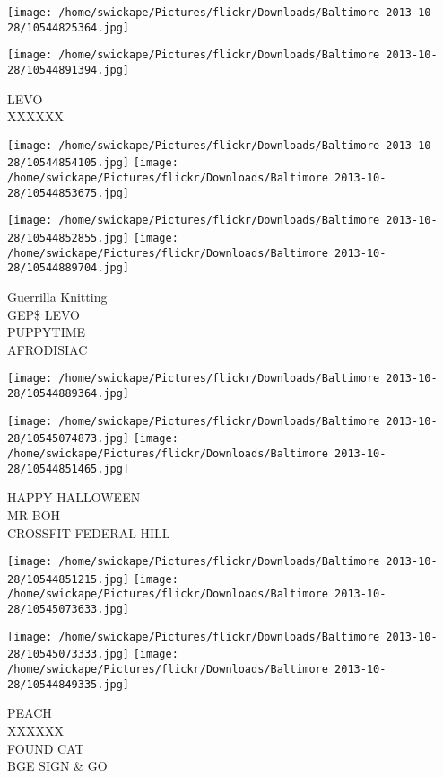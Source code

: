 \documentclass[10pt,letterpaper]{article}
\begin{document}
\texttt{[image: /home/swickape/Pictures/flickr/Downloads/Baltimore 2013-10-28/10544825364.jpg]}

\vspace{0.25in}
\texttt{[image: /home/swickape/Pictures/flickr/Downloads/Baltimore 2013-10-28/10544891394.jpg]}

LEVO\\
XXXXXX\\
\pagebreak

\texttt{[image: /home/swickape/Pictures/flickr/Downloads/Baltimore 2013-10-28/10544854105.jpg]}
\texttt{[image: /home/swickape/Pictures/flickr/Downloads/Baltimore 2013-10-28/10544853675.jpg]}

\texttt{[image: /home/swickape/Pictures/flickr/Downloads/Baltimore 2013-10-28/10544852855.jpg]}
\texttt{[image: /home/swickape/Pictures/flickr/Downloads/Baltimore 2013-10-28/10544889704.jpg]}

Guerrilla Knitting\\
GEP\$ LEVO\\
PUPPYTIME\\
AFRODISIAC\\
\pagebreak

\texttt{[image: /home/swickape/Pictures/flickr/Downloads/Baltimore 2013-10-28/10544889364.jpg]}

\vspace{0.25in}
\texttt{[image: /home/swickape/Pictures/flickr/Downloads/Baltimore 2013-10-28/10545074873.jpg]}
\texttt{[image: /home/swickape/Pictures/flickr/Downloads/Baltimore 2013-10-28/10544851465.jpg]}

HAPPY HALLOWEEN\\
MR BOH\\
CROSSFIT FEDERAL HILL\\
\pagebreak

\texttt{[image: /home/swickape/Pictures/flickr/Downloads/Baltimore 2013-10-28/10544851215.jpg]}
\texttt{[image: /home/swickape/Pictures/flickr/Downloads/Baltimore 2013-10-28/10545073633.jpg]}

\texttt{[image: /home/swickape/Pictures/flickr/Downloads/Baltimore 2013-10-28/10545073333.jpg]}
\texttt{[image: /home/swickape/Pictures/flickr/Downloads/Baltimore 2013-10-28/10544849335.jpg]}

PEACH\\
XXXXXX\\
FOUND CAT\\
BGE SIGN \& GO\\
\pagebreak
\end{document}
